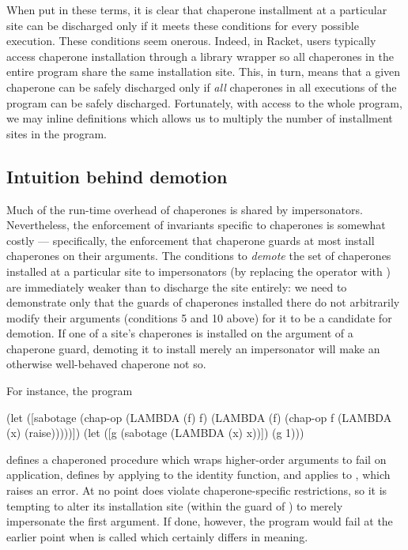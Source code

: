 When put in these terms, it is clear that chaperone installment at a particular site can be discharged only if it meets these conditions for every possible execution.
These conditions seem onerous.
Indeed, in Racket, users typically access chaperone installation through a library wrapper so all chaperones in the entire program share the same installation site.
This, in turn, means that a given chaperone can be safely discharged only if \emph{all} chaperones in all executions of the program can be safely discharged.
Fortunately, with access to the whole program, we may inline definitions which allows us to multiply the number of installment sites in the program.

\subsection{Intuition behind demotion}

Much of the run-time overhead of chaperones is shared by impersonators.
Nevertheless, the enforcement of invariants specific to chaperones is somewhat costly --- specifically, the enforcement that chaperone guards at most install chaperones on their arguments.
The conditions to \emph{demote} the set of chaperones installed at a particular site to impersonators (by replacing the  operator with ) are immediately weaker than to discharge the site entirely: we need to demonstrate only that the guards of chaperones installed there do not arbitrarily modify their arguments (conditions 5 and 10 above) for it to be a candidate for demotion.
If one of a site's chaperones is installed on the argument of a chaperone guard, demoting it to install merely an impersonator will make an otherwise well-behaved chaperone not so.

For instance, the program
\begin{schemedisplay}
(let ([sabotage (chap-op
                 (LAMBDA (f) f)
                 (LAMBDA (f) (chap-op f (LAMBDA (x) (raise)))))])
  (let ([g (sabotage (LAMBDA (x) x))])
    (g 1)))
\end{schemedisplay}
defines a chaperoned procedure  which wraps higher-order arguments to fail on application, defines  by applying  to the identity function, and applies  to , which raises an error.
At no point does  violate chaperone-specific restrictions, so it is tempting to alter its installation site (within the guard of ) to merely impersonate the first argument.
If done, however, the program would fail at the earlier point when  is called which certainly differs in meaning.

